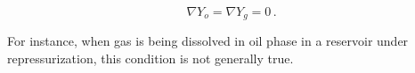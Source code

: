 \documentclass[authoryear,preprint,review,12pt]{elsarticle}
\begin{document}
\begin{equation}
\nabla Y_o = \nabla Y_g = 0 \, .
\end{equation}

For instance, when gas is being dissolved in oil phase in a reservoir under repressurization, this condition is not generally true.

%
%
%
%
\end{document}

